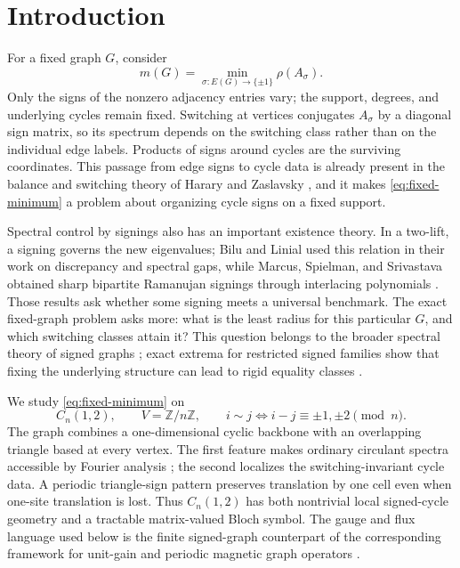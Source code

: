 \section{Introduction}
\label{sec:introduction}

For a fixed graph $G$, consider
\begin{equation}
 m(G)=\min_{\sigma:E(G)\to\{\pm1\}}\rho(A_\sigma).
 \label{eq:fixed-minimum}
\end{equation}
Only the signs of the nonzero adjacency entries vary; the support, degrees,
and underlying cycles remain fixed.  Switching at vertices conjugates
$A_\sigma$ by a diagonal sign matrix, so its spectrum depends on the switching
class rather than on the individual edge labels.  Products of signs around
cycles are the surviving coordinates.  This passage from edge signs to cycle
data is already present in the balance and switching theory of Harary and
Zaslavsky \cite{Harary1953,Zaslavsky1982}, and it makes
\eqref{eq:fixed-minimum} a problem about organizing cycle signs on a fixed
support.

Spectral control by signings also has an important existence theory.  In a
two-lift, a signing governs the new eigenvalues; Bilu and Linial used this
relation in their work on discrepancy and spectral gaps, while Marcus,
Spielman, and Srivastava obtained sharp bipartite Ramanujan signings through
interlacing polynomials \cite{BiluLinial2006,MarcusSpielmanSrivastava2015}.
Those results ask whether some signing meets a universal benchmark.  The exact
fixed-graph problem asks more: what is the least radius for this particular
$G$, and which switching classes attain it?  This question belongs to the
broader spectral theory of signed graphs \cite{BelardoEtAl2018}; exact extrema
for restricted signed families show that fixing the underlying structure can
lead to rigid equality classes \cite{BrunettiStanic2022,GhorbaniMajidi2024}.

We study \eqref{eq:fixed-minimum} on
\[
 C_n(1,2),\qquad V=\mathbb Z/n\mathbb Z,\qquad
 i\sim j\iff i-j\equiv\pm1,\pm2\pmod n.
\]
The graph combines a one-dimensional cyclic backbone with an overlapping
triangle based at every vertex.  The first feature makes ordinary circulant
spectra accessible by Fourier analysis \cite{Davis1979}; the second localizes
the switching-invariant cycle data.  A periodic triangle-sign pattern preserves
translation by one cell even when one-site translation is lost.  Thus
$C_n(1,2)$ has both nontrivial local signed-cycle geometry and a tractable
matrix-valued Bloch symbol.  The gauge and flux language used below is the
finite signed-graph counterpart of the corresponding framework for unit-gain
and periodic magnetic graph operators
\cite{Reff2012,KorotyaevSaburova2017,KorotyaevSaburova2023}.


